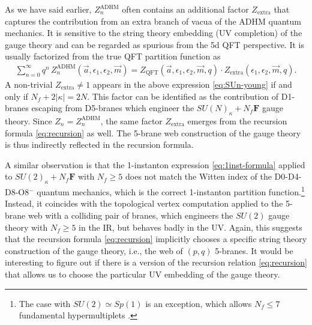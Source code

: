 \documentclass[letterpaper, 11pt]{article}
\def\e{\epsilon}
\begin{document}
{As we have said earlier, $Z_n^\text{ADHM}$ often contains an additional factor $Z_\text{extra}$ that captures the contribution from an extra branch of vacua of the ADHM quantum mechanics. It is sensitive to the string theory embedding (UV completion) of the gauge theory and can be regarded as spurious from the 5d QFT perspective. It is usually factorized from the true QFT partition function as 
\begin{align}
  \sum_{n=0}^\infty q^n \,Z_n^\text{ADHM}(\vec{a}, \e_{1},\e_2, \vec{m}) = Z_\text{QFT}(\vec{a}, \e_{1},\e_2, \vec{m},q) \cdot Z_\text{extra}(\e_{1},\e_2,  \vec{m},q).
\end{align}
A non-trivial $Z_\text{extra}\neq 1$ appears in the above expression \eqref{eq:SUn-young} if and only if $N_f + 2|\kappa| = 2N$. This factor can be identified as the contribution of D1-branes escaping from D5-branes which engineer the $SU(N)_\kappa + N_f\mathbf{F}$ gauge theory. Since $Z_n = Z_n^\text{ADHM}$, the same factor $Z_\text{extra}$ emerges from the recursion formula \eqref{eq:recursion} as well. The 5-brane web construction of the gauge theory is thus indirectly reflected in the recursion formula. 

A similar observation is that the 1-instanton expression \eqref{eq:1inst-formula} applied to $SU(2)_\kappa+N_f\mathbf{F}$ with $N_f \geq 5$ does not match the Witten index of the D0-D4-D8-O8${}^-$  quantum mechanics, which is the correct 1-instanton partition function.\footnote{The case with $SU(2) \simeq Sp(1
)$ is an exception, which allows $N_f \leq 7$ fundamental hypermultiplets \cite{Seiberg:1996bd}.} Instead, it coincides with the topological vertex computation applied to the 5-brane web with a colliding pair of branes, which engineers the $SU(2)$ gauge theory with $N_f \geq 5$ in the IR, but behaves badly in the UV. Again, this suggests that the recursion formula \eqref{eq:recursion} implicitly chooses a specific string theory construction of the gauge theory, i.e., the web of $(p,q)$ 5-branes. It would be interesting to figure out if there is a version of the recursion relation \eqref{eq:recursion} that allows us to choose the particular UV embedding of the gauge theory. 


}
\end{document}
